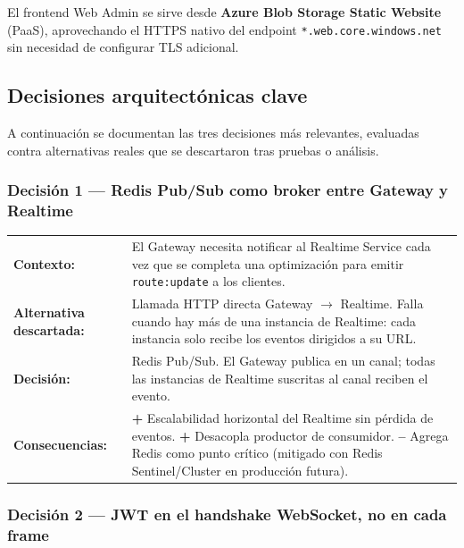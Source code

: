\documentclass[12pt,a4paper,oneside]{article}
\begin{document}
El frontend Web Admin se sirve desde \textbf{Azure Blob Storage Static Website} (PaaS), aprovechando el HTTPS nativo del endpoint \texttt{*.web.core.windows.net} sin necesidad de configurar TLS adicional.

\subsection{Decisiones arquitect\'onicas clave}

A continuaci\'on se documentan las tres decisiones m\'as relevantes, evaluadas contra alternativas reales que se descartaron tras pruebas o an\'alisis.

\subsubsection*{Decisi\'on 1 --- Redis Pub/Sub como broker entre Gateway y Realtime}

\begin{tabular}{p{} p{}}
\textbf{Contexto:} & El Gateway necesita notificar al Realtime Service cada vez que se completa una optimizaci\'on para emitir \texttt{route:update} a los clientes. \\
\textbf{Alternativa descartada:} & Llamada HTTP directa Gateway $\rightarrow$ Realtime. Falla cuando hay m\'as de una instancia de Realtime: cada instancia solo recibe los eventos dirigidos a su URL. \\
\textbf{Decisi\'on:} & Redis Pub/Sub. El Gateway publica en un canal; todas las instancias de Realtime suscritas al canal reciben el evento. \\
\textbf{Consecuencias:} & \textbf{+} Escalabilidad horizontal del Realtime sin p\'erdida de eventos. \textbf{+} Desacopla productor de consumidor. \textbf{--} Agrega Redis como punto cr\'itico (mitigado con Redis Sentinel/Cluster en producci\'on futura). \\
\end{tabular}

\subsubsection*{Decisi\'on 2 --- JWT en el handshake WebSocket, no en cada frame}
\end{document}

